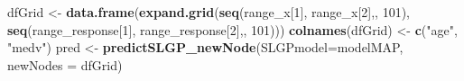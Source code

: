 \documentclass[
]{article}
\newenvironment{Shaded}{\begin{snugshade}}{\end{snugshade}}
\newcommand{\AttributeTok}[1]{\textcolor[rgb]{0.13,0.29,0.53}{#1}}
\newcommand{\DecValTok}[1]{\textcolor[rgb]{0.00,0.00,0.81}{#1}}
\newcommand{\FunctionTok}[1]{\textcolor[rgb]{0.13,0.29,0.53}{\textbf{#1}}}
\newcommand{\NormalTok}[1]{#1}
\newcommand{\OtherTok}[1]{\textcolor[rgb]{0.56,0.35,0.01}{#1}}
\newcommand{\StringTok}[1]{\textcolor[rgb]{0.31,0.60,0.02}{#1}}
\begin{document}
\begin{Shaded}
\begin{Highlighting}[]
\NormalTok{dfGrid }\OtherTok{\textless{}{-}} \FunctionTok{data.frame}\NormalTok{(}\FunctionTok{expand.grid}\NormalTok{(}\FunctionTok{seq}\NormalTok{(range\_x[}\DecValTok{1}\NormalTok{], range\_x[}\DecValTok{2}\NormalTok{],, }\DecValTok{101}\NormalTok{), }
                                 \FunctionTok{seq}\NormalTok{(range\_response[}\DecValTok{1}\NormalTok{], range\_response[}\DecValTok{2}\NormalTok{],, }\DecValTok{101}\NormalTok{)))}
\FunctionTok{colnames}\NormalTok{(dfGrid) }\OtherTok{\textless{}{-}} \FunctionTok{c}\NormalTok{(}\StringTok{"age"}\NormalTok{, }\StringTok{"medv"}\NormalTok{)}
\NormalTok{pred }\OtherTok{\textless{}{-}} \FunctionTok{predictSLGP\_newNode}\NormalTok{(}\AttributeTok{SLGPmodel=}\NormalTok{modelMAP,}
                            \AttributeTok{newNodes =}\NormalTok{ dfGrid)}


\end{Highlighting}
\end{Shaded}
\end{document}

